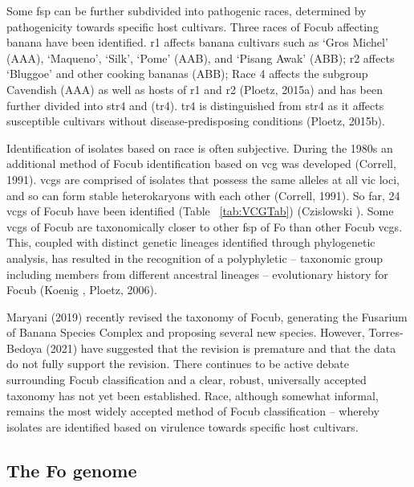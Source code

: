 Some \ac{fsp} can be further subdivided into pathogenic races, determined by pathogenicity towards specific host cultivars. Three races of \ac{Focub} affecting banana have been identified. \acf{r1}  affects banana cultivars such as ‘Gros Michel’ (AAA), ‘Maqueno’, ‘Silk’, ‘Pome’ (AAB), and ‘Pisang Awak’ (ABB); \acf{r2} affects ‘Bluggoe’ and other cooking bananas (ABB); Race 4 affects the subgroup Cavendish (AAA) as well as hosts of \ac{r1} and \ac{r2} (Ploetz, 2015a) and has been further divided into \ac{str4} and (\ac{tr4}). \Ac{tr4} is distinguished from \ac{str4} as it affects susceptible cultivars without disease-predisposing conditions (Ploetz, 2015b).  

Identification of isolates based on race is often subjective. During the 1980s an additional method of \ac{Focub} identification based on \ac{vcg} was developed (Correll, 1991). \acp{vcg} are comprised of isolates that possess the same alleles at all \ac{vic} loci, and so can form stable heterokaryons with each other (Correll, 1991). So far, 24 \acp{vcg} of \ac{Focub} have been identified (Table ~\ref{tab:VCGTab}) (Czislowski ).  Some \acp{vcg} of \ac{Focub} are taxonomically closer to other \ac{fsp} of \ac{Fo} than other \ac{Focub} \acp{vcg}. This, coupled with distinct genetic lineages identified through phylogenetic analysis, has resulted in the recognition of a polyphyletic – taxonomic group including members from different ancestral lineages – evolutionary history for \ac{Focub} (Koenig , Ploetz, 2006). 

Maryani \et (2019) recently revised the taxonomy of \ac{Focub}, generating the Fusarium of Banana Species Complex and proposing several new species. However, Torres-Bedoya \et (2021) have suggested that the revision is premature and that the data do not fully support the revision. There continues to be active debate surrounding \ac{Focub} classification and a clear, robust, universally accepted taxonomy has not yet been established. Race, although somewhat informal, remains the most widely accepted method of \ac{Focub} classification – whereby isolates are identified based on virulence towards specific host cultivars.  



\subsection{The \acl{Fo} genome} 

